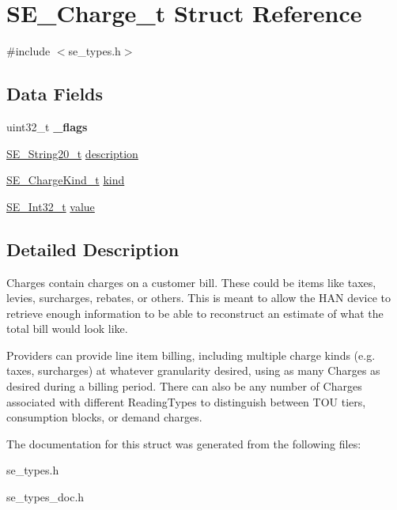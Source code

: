 \hypertarget{structSE__Charge__t}{}\section{S\+E\+\_\+\+Charge\+\_\+t Struct Reference}
\label{structSE__Charge__t}


{\ttfamily \#include $<$se\+\_\+types.\+h$>$}

\subsection*{Data Fields}
\begin{DoxyCompactItemize}
\item 
uint32\+\_\+t {\bfseries \+\_\+flags}
\item 
\hyperlink{group__String20_gac62354528eb48096f8deab6e503a3193}{S\+E\+\_\+\+String20\+\_\+t} \hyperlink{group__Charge_gaf71b9ce21de6c7acc90259e2ead7523b}{description}
\item 
\hyperlink{group__ChargeKind_gac33236bd52e13aede011017e581420b8}{S\+E\+\_\+\+Charge\+Kind\+\_\+t} \hyperlink{group__Charge_gaa4b5e0563a6399b45d450cd7140d6404}{kind}
\item 
\hyperlink{group__Int32_gaa7afc819cfc8033c5fa408e34da8b71a}{S\+E\+\_\+\+Int32\+\_\+t} \hyperlink{group__Charge_gaeaac7d57d7b8c24acd4edd955b84f618}{value}
\end{DoxyCompactItemize}


\subsection{Detailed Description}
Charges contain charges on a customer bill. These could be items like taxes, levies, surcharges, rebates, or others. This is meant to allow the H\+AN device to retrieve enough information to be able to reconstruct an estimate of what the total bill would look like.

Providers can provide line item billing, including multiple charge kinds (e.\+g. taxes, surcharges) at whatever granularity desired, using as many Charges as desired during a billing period. There can also be any number of Charges associated with different Reading\+Types to distinguish between T\+OU tiers, consumption blocks, or demand charges. 

The documentation for this struct was generated from the following files\+:\begin{DoxyCompactItemize}
\item 
se\+\_\+types.\+h\item 
se\+\_\+types\+\_\+doc.\+h\end{DoxyCompactItemize}
